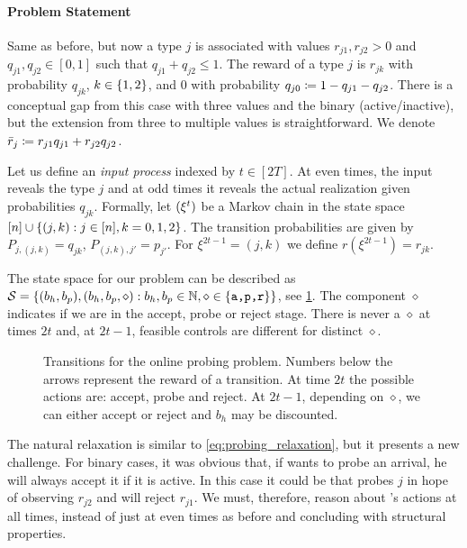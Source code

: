 \documentclass[letterpaper,11pt]{article}
\begin{document}
\paragraph{Problem Statement}
Same as before, but now a type $j$ is associated with values $r_{j1},r_{j2}>0$ and $q_{j1},q_{j2}\in[0,1]$ such that $q_{j1}+q_{j2}\leq 1$.
The reward of a type $j$ is $r_{jk}$ with probability $q_{jk}$, $k\in\{1,2\}$, and $0$ with probability $q_{j0}\coloneqq1-q_{j1}-q_{j2}$.
There is a conceptual gap from this case with three values and the binary (active/inactive), but the extension from three to multiple values is straightforward.
We denote $\bar r_j\coloneqq r_{j1}q_{j1}+r_{j2}q_{j2}$.

Let us define an \emph{input process} indexed by $t\in[2T]$.
At even times, the input reveals the type $j$ and at odd times it reveals the actual realization given probabilities $q_{jk}$.
Formally, let $(\xi^t)$ be a Markov chain in the state space $[n]\cup\{(j,k):j\in[n],k=0,1,2\}$.
The transition probabilities are given by $P_{j,(j,k)}=q_{jk}$, $P_{(j,k),j'}=p_{j'}$.
For $\xi^{2t-1}=(j,k)$ we define $r(\xi^{2t-1})=r_{jk}$.

The state space for our problem can be described as $\mathcal{S}=\{(b_h,b_p),(b_h,b_p,\diamond):b_h,b_p\in\mathbb{N},\diamond\in \{\texttt{a,p,r}\}\}$, see \cref{fig:probing_states}.
The component $\diamond$ indicates if we are in the accept, probe or reject stage.
There is never a $\diamond$ at times $2t$ and, at $2t-1$, feasible controls are different for distinct $\diamond$.

\begin{figure}
\centering
\scalebox{0.9}{%

}
\caption{Transitions for the online probing problem. 
Numbers below the arrows represent the reward of a transition.
At time $2t$ the possible actions are: accept, probe and reject.
At $2t-1$, depending on $\diamond$, we can either accept or reject and $b_h$ may be discounted.
}
\label{fig:probing_states}
\end{figure}

The natural relaxation is similar to \cref{eq:probing_relaxation}, but it presents a new challenge.
For binary cases, it was obvious that, if \off wants to probe an arrival, he will always accept it if it is active.
In this case it could be that \off probes $j$ in hope of observing $r_{j2}$ and will reject $r_{j1}$.
We must, therefore, reason about \off's actions at all times, instead of just at even times as before and concluding with structural properties.
\end{document}

